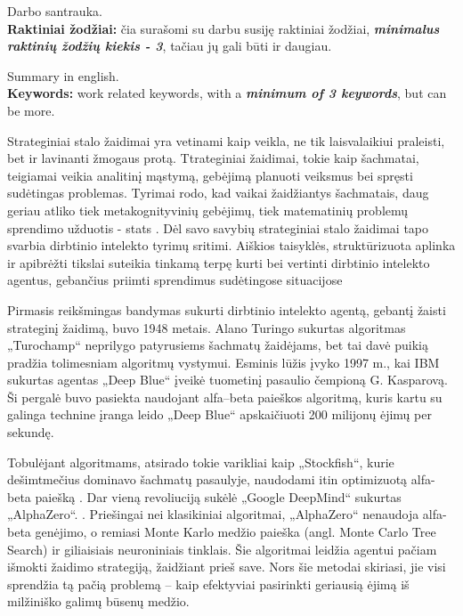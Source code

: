 \documentclass[]{VUMIFTemplateClass}
\begin{document}

\onehalfspacing







Darbo santrauka.\\

\textbf{Raktiniai žodžiai:} čia surašomi su darbu susiję raktiniai žodžiai, \textit{\textbf{minimalus raktinių žodžių kiekis - 3}}, tačiau jų gali būti ir daugiau.


Summary in english.\\

\textbf{Keywords:} work related keywords, with a \textit{\textbf{minimum of 3 keywords}}, but can be more.


\singlespacing


\tableofcontents
\onehalfspacing





Strateginiai stalo žaidimai yra vetinami kaip veikla, ne tik laisvalaikiui praleisti, bet ir lavinanti žmogaus protą. Ttrateginiai žaidimai, tokie kaip šachmatai, teigiamai veikia analitinį mąstymą, gebėjimą planuoti veiksmus bei spręsti sudėtingas problemas. Tyrimai rodo, kad vaikai žaidžiantys šachmatais, daug geriau atliko tiek metakognityvinių gebėjimų, tiek matematinių problemų sprendimo užduotis - stats \cite{KYM12}.  Dėl savo savybių strateginiai stalo žaidimai tapo svarbia dirbtinio intelekto tyrimų sritimi. Aiškios taisyklės, struktūrizuota aplinka ir apibrėžti tikslai suteikia tinkamą terpę kurti bei vertinti dirbtinio intelekto agentus, gebančius priimti sprendimus sudėtingose situacijose\cite{GVR04}

 Pirmasis reikšmingas bandymas sukurti dirbtinio intelekto agentą, gebantį žaisti strateginį žaidimą, buvo 1948 metais. Alano Turingo sukurtas algoritmas „Turochamp“ \cite{CPW21} neprilygo patyrusiems šachmatų žaidėjams, bet tai davė puikią pradžia tolimesniam algoritmų vystymui. Esminis lūžis įvyko 1997 m., kai IBM sukurtas agentas „Deep Blue“ įveikė tuometinį pasaulio čempioną G. Kasparovą. Ši pergalė buvo pasiekta naudojant alfa–beta paieškos algoritmą, kuris kartu su galinga technine įranga leido „Deep Blue“ apskaičiuoti 200 milijonų ėjimų per sekundę. \cite{CHH02}

Tobulėjant algoritmams, atsirado tokie varikliai kaip „Stockfish“, kurie dešimtmečius dominavo šachmatų pasaulyje, naudodami itin optimizuotą alfa-beta paiešką \cite{}. Dar vieną revoliuciją sukėlė „Google DeepMind“ sukurtas „AlphaZero“. \cite{Sil18}. Priešingai nei klasikiniai algoritmai, „AlphaZero“ nenaudoja alfa-beta genėjimo, o remiasi Monte Karlo medžio paieška (angl. Monte Carlo Tree Search) ir giliaisiais neuroniniais tinklais. Šie algoritmai leidžia agentui pačiam išmokti žaidimo strategiją, žaidžiant prieš save. Nors šie metodai skiriasi, jie visi sprendžia tą pačią problemą – kaip efektyviai pasirinkti geriausią ėjimą iš milžiniško galimų būsenų medžio.
\end{document}
